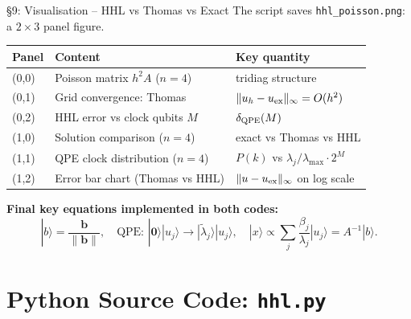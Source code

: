 \documentclass{beamer}
\begin{document}

\begin{frame}{\S9: Visualisation -- HHL vs Thomas vs Exact}
The script saves \texttt{hhl\_poisson.png}: a $2\times 3$ panel figure.

\medskip
\begin{center}
\small
\begin{tabular}{lll}
\toprule
Panel & Content & Key quantity \\
\midrule
(0,0) & Poisson matrix $h^2 A$ ($n=4$) & tridiag structure \\
(0,1) & Grid convergence: Thomas & $\|u_h - u_{\rm ex}\|_\infty = O(h^2)$ \\
(0,2) & HHL error vs clock qubits $M$ & $\delta_{\rm QPE}(M)$ \\
(1,0) & Solution comparison ($n=4$) & exact vs Thomas vs HHL \\
(1,1) & QPE clock distribution ($n=4$) & $P(k)$ vs $\lambda_j/\lambda_{\max}\cdot 2^M$ \\
(1,2) & Error bar chart (Thomas vs HHL) & $\|u-u_{\rm ex}\|_\infty$ on log scale \\
\bottomrule
\end{tabular}
\end{center}

\medskip
\textbf{Final key equations implemented in both codes:}
\[
  |b\rangle = \frac{\mathbf{b}}{\|\mathbf{b}\|},
  \quad
  \text{QPE: }|\mathbf{0}\rangle|u_j\rangle \to |\widetilde{\lambda}_j\rangle|u_j\rangle,
  \quad
  |x\rangle \propto \sum_j \frac{\beta_j}{\lambda_j}|u_j\rangle = A^{-1}|b\rangle.
\]
\end{frame}


\section{Python Source Code: \texttt{hhl.py}}
\end{document}
